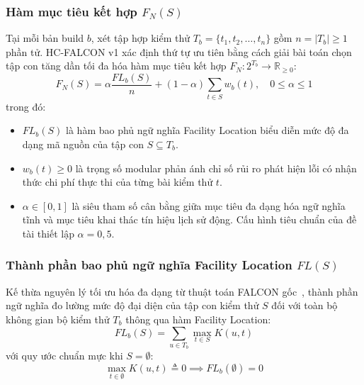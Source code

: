 \subsubsection{Hàm mục tiêu kết hợp \texorpdfstring{$F_N(S)$}{FN(S)}}
\label{subsubsec:combined_objective}

Tại mỗi bản build $b$, xét tập hợp kiểm thử $T_b = \{t_1, t_2, \dots, t_n\}$ gồm $n = |T_b| \ge 1$ phần tử. HC-FALCON v1 xác định thứ tự ưu tiên bằng cách giải bài toán chọn tập con tăng dần tối đa hóa hàm mục tiêu kết hợp $F_N: 2^{T_b} \to \mathbb{R}_{\ge 0}$:
\begin{equation}
\label{eq:combined_objective}
F_N(S) = \alpha \frac{FL_b(S)}{n} + (1 - \alpha) \sum_{t \in S} w_b(t), \quad 0 \le \alpha \le 1
\end{equation}
trong đó:
\begin{itemize}
    \item $FL_b(S)$ là hàm bao phủ ngữ nghĩa Facility Location biểu diễn mức độ đa dạng mã nguồn của tập con $S \subseteq T_b$.
    \item $w_b(t) \ge 0$ là trọng số modular phản ánh chỉ số rủi ro phát hiện lỗi có nhận thức chi phí thực thi của từng bài kiểm thử $t$.
    \item $\alpha \in [0, 1]$ là siêu tham số cân bằng giữa mục tiêu đa dạng hóa ngữ nghĩa tĩnh và mục tiêu khai thác tín hiệu lịch sử động. Cấu hình tiêu chuẩn của đề tài thiết lập $\alpha = 0{,}5$.
\end{itemize}

\subsubsection{Thành phần bao phủ ngữ nghĩa Facility Location \texorpdfstring{$FL(S)$}{FL(S)}}
\label{subsubsec:facility_location}

Kế thừa nguyên lý tối ưu hóa đa dạng từ thuật toán FALCON gốc~\cite{falcon2026}, thành phần ngữ nghĩa đo lường mức độ đại diện của tập con kiểm thử $S$ đối với toàn bộ không gian bộ kiểm thử $T_b$ thông qua hàm Facility Location:
\begin{equation}
\label{eq:facility_location}
FL_b(S) = \sum_{u \in T_b} \max_{t \in S} K(u, t)
\end{equation}
với quy ước chuẩn mực khi $S = \emptyset$:
\begin{equation}
\max_{t \in \emptyset} K(u, t) \triangleq 0 \implies FL_b(\emptyset) = 0
\end{equation}

